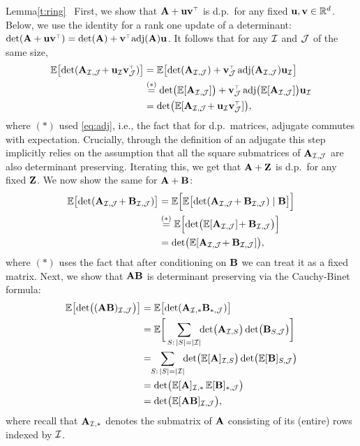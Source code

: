 \documentclass[../../thesis.tex]{subfiles}
\begin{document}
\begin{proofof}{Lemma}{\ref{t:ring}} \
  First, we show that $\A+\u\v^\top$ is d.p.~for any fixed
  $\mathbf u,\mathbf v\in\mathbb R^d$. Below, we use the identity for a rank one
  update of a determinant:
  $\det(\A+\u\v^\top)=\det(\A)+\v^\top\!\adj(\A)\u$. It follows that
  for any $\mathcal I$ and $\mathcal{J}$ of the same size,
  \begin{align*}
    \E\big[\!\det(\A_{\Ic,\Jc}\!+\u_{\Ic}\v_{\Jc}^\top)\big] & =
    \E\big[\!\det(\A_{\Ic,\Jc}) +
    \v_{\Jc}^\top\adj(\A_{\Ic,\Jc}) \u_{\Ic}\big]                                                                           \\
                                                             & \overset{(*)}{=}\det\!\big(\E[\A_{\Ic,\Jc}]\big) +
    \v_{\Jc}^\top\adj\!\big(\E[\A_{\Ic,\Jc}]\big) \u_{\Ic}                                                                  \\
                                                             & =\det\!\big(\E[\A_{\Ic,\Jc} \!+ \u_{\Ic}\v_{\Jc}^\top]\big),
  \end{align*}
  where $(*)$ used \eqref{eq:adj}, i.e., the fact that for d.p.~matrices, adjugate commutes
  with expectation. Crucially, through the definition of an adjugate
  this step implicitly relies on the assumption that all the square
  submatrices of $\mathbf A_{\mathcal I,\mathcal{J}}$ are also  determinant preserving.
  Iterating this, we get that $\mathbf A+\mathbf Z$ is d.p.~for any fixed
  $\mathbf Z$. We now show the same for $\mathbf A+\mathbf B$:
  \begin{align*}
    \E\big[\!\det(\A_{\Ic,\Jc}\!+\B_{\Ic,\Jc})\big]
     & =
    \E\Big[\E\big[\!\det(\A_{\Ic,\Jc}\!+\B_{\Ic,\Jc})\mid\B\big]\Big]                \\
     & \overset{(*)}{=}\E\Big[\!\det\!\big(\E[\A_{\Ic,\Jc}]\!+\B_{\Ic,\Jc}\big)\Big] \\
     & = \det\!\big(\E[\A_{\Ic,\Jc}\!+\B_{\Ic,\Jc}]\big),
  \end{align*}
  where $(*)$  uses the fact that after conditioning on $\mathbf B$ we can
  treat it as a fixed matrix. Next, we show that $\mathbf A\mathbf B$ is determinant preserving via the Cauchy-Binet formula:
  \begin{align*}
    \E\big[\!\det\!\big((\A\B)_{\Ic,\Jc}\big)\big]
     & = \E\big[\!\det(\A_{\Ic,*}\B_{*,\Jc})\big]                  \\
     & =\E\bigg[\sum_{S:\,|S|=|\Ic|}\!\!\det\!\big(\A_{\Ic,S}\big)
    \det\!\big(\B_{S,\Jc}\big)\bigg]                               \\
     & =\!\!\sum_{S:\,|S|=|\Ic|}\!\!\det\!\big(\E[\A]_{\Ic,S}\big)
    \det\!\big(\E[\B]_{S,\Jc}\big)                                 \\
     & =\det\!\big(\E[\A]_{\Ic,*}\, \E[\B]_{*,\Jc}\big)            \\
     & = \det\!\big(\E[\A\B]_{\Ic,\Jc}\big),
  \end{align*}
  where recall that $\mathbf A_{\mathcal I,*}$ denotes the submatrix of $\mathbf A$
  consisting of its (entire) rows indexed by $\mathcal I$.
\end{proofof}
\end{document}
